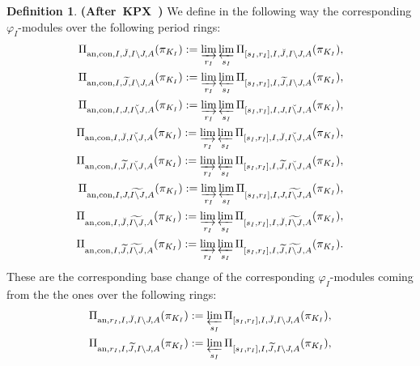 \documentclass[12pt]{amsart}
\theoremstyle{definition}
\newtheorem{definition}[theorem]{Definition}
\numberwithin{equation}{section}
\begin{document}
\begin{definition} \mbox{\bf{(After KPX \cite[Definition 2.2.6]{KPX})}}
We define in the following way the corresponding $\varphi_I$-modules over the following period rings:
\begin{align}
\Pi_{\mathrm{an},\mathrm{con},I,\breve{J},I\backslash J,A}(\pi_{K_I}):=\varinjlim_{r_I}\varprojlim_{s_I}\Pi_{[s_I,r_I],I,\breve{J},I\backslash J,A}(\pi_{K_I}),\\	
\Pi_{\mathrm{an},\mathrm{con},I,\widetilde{J},I\backslash J,A}(\pi_{K_I}):=\varinjlim_{r_I}\varprojlim_{s_I} \Pi_{[s_I,r_I],I,\widetilde{J},I\backslash J,A}(\pi_{K_I}),\\
\Pi_{\mathrm{an},\mathrm{con},I,J,\breve{I\backslash J},A}(\pi_{K_I}):=\varinjlim_{r_I}\varprojlim_{s_I}\Pi_{[s_I,r_I],I,J,\breve{I\backslash J},A}(\pi_{K_I}),\\	
\Pi_{\mathrm{an},\mathrm{con},I,\breve{J},\breve{I\backslash J},A}(\pi_{K_I}):=\varinjlim_{r_I}\varprojlim_{s_I} \Pi_{[s_I,r_I],I,\breve{J},\breve{I\backslash J},A}(\pi_{K_I}),\\
\Pi_{\mathrm{an},\mathrm{con},I,\widetilde{J},\breve{I\backslash J},A}(\pi_{K_I}):=\varinjlim_{r_I}\varprojlim_{s_I} \Pi_{[s_I,r_I],I,\widetilde{J},\breve{I\backslash J},A}(\pi_{K_I}),\\
\Pi_{\mathrm{an},\mathrm{con},I,J,\widetilde{I\backslash J},A}(\pi_{K_I}):=\varinjlim_{r_I}\varprojlim_{s_I} \Pi_{[s_I,r_I],I,J,\widetilde{I\backslash J},A}(\pi_{K_I}),\\	
\Pi_{\mathrm{an},\mathrm{con},I,\breve{J},\widetilde{I\backslash J},A}(\pi_{K_I}):=\varinjlim_{r_I}\varprojlim_{s_I} \Pi_{[s_I,r_I],I,\breve{J},\widetilde{I\backslash J},A}(\pi_{K_I}),\\	
\Pi_{\mathrm{an},\mathrm{con},I,\widetilde{J},\widetilde{I\backslash J},A}(\pi_{K_I}):=\varinjlim_{r_I}\varprojlim_{s_I} \Pi_{[s_I,r_I],I,\widetilde{J},\widetilde{I\backslash J},A}(\pi_{K_I}).	
\end{align}	
These are the corresponding base change of the corresponding $\varphi_I$-modules coming from the the ones over the following rings:
\begin{align}
\Pi_{\mathrm{an},r_I,I,\breve{J},I\backslash J,A}(\pi_{K_I}):=\varprojlim_{s_I}\Pi_{[s_I,r_I],I,\breve{J},I\backslash J,A}(\pi_{K_I}),\\	
\Pi_{\mathrm{an},r_I,I,\widetilde{J},I\backslash J,A}(\pi_{K_I}):=\varprojlim_{s_I} \Pi_{[s_I,r_I],I,\widetilde{J},I\backslash J,A}(\pi_{K_I}),\\

\end{align}
\end{definition}
\end{document}
